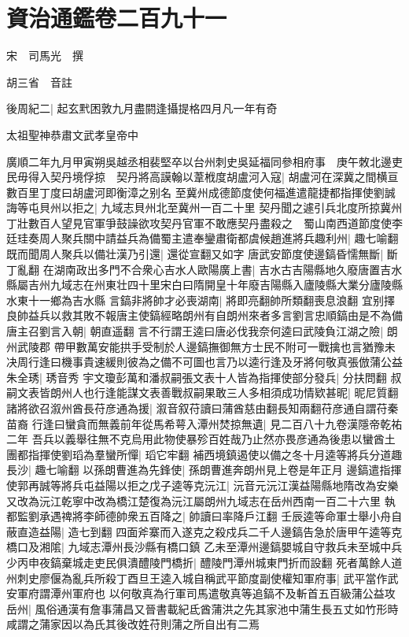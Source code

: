 \chapter{資治通鑑卷二百九十一}
宋　司馬光　撰

胡三省　音註

後周紀二|{
	起玄黓困敦九月盡閼逢攝提格四月凡一年有奇}


太祖聖神恭肅文武孝皇帝中

廣順二年九月甲寅朔吳越丞相裴堅卒以台州刺史吳延福同參相府事　庚午敇北邊吏民毋得入契丹境俘掠　契丹將高謨翰以葦栰度胡盧河入寇|{
	胡盧河在深冀之間横亘數百里丁度曰胡盧河即衡漳之别名}
至冀州成德節度使何福進遣龍捷都指揮使劉誠誨等屯貝州以拒之|{
	九域志貝州北至冀州一百二十里}
契丹聞之遽引兵北度所掠冀州丁壯數百人望見官軍爭鼓譟欲攻契丹官軍不敢應契丹盡殺之　蜀山南西道節度使李廷珪奏周人聚兵關中請益兵為備蜀主遣奉鑾肅衛都虞候趙進將兵趣利州|{
	趣七喻翻}
既而聞周人聚兵以備壮漢乃引還|{
	還從宣翻又如字}
唐武安節度使邊鎬昏懦無斷|{
	斷丁亂翻}
在湖南政出多門不合衆心吉水人歐陽廣上書|{
	吉水古吉陽縣地久廢唐置吉水縣屬吉州九域志在州東壮四十里宋白曰隋開皇十年廢吉陽縣入廬陵縣大業分廬陵縣水東十一鄉為吉水縣}
言鎬非將帥才必喪湖南|{
	將即亮翻帥所類翻喪息浪翻}
宜别擇良帥益兵以救其敗不報唐主使鎬經略朗州有自朗州來者多言劉言忠順鎬由是不為備唐主召劉言入朝|{
	朝直遥翻}
言不行謂王逵曰唐必伐我奈何逵曰武陵負江湖之險|{
	朗州武陵郡}
帶甲數萬安能拱手受制於人邊鎬撫御無方士民不附可一戰擒也言猶豫未决周行逢曰機事貴速緩則彼為之備不可圖也言乃以逵行逢及牙將何敬真張倣蒲公益朱全琇|{
	琇音秀}
宇文瓊彭萬和潘叔嗣張文表十人皆為指揮使部分發兵|{
	分扶問翻}
叔嗣文表皆朗州人也行逢能謀文表善戰叔嗣果敢三人多相須成功情欵甚昵|{
	昵尼質翻}
諸將欲召溆州酋長苻彦通為援|{
	溆音叙苻讀曰蒲酋慈由翻長知兩翻苻彦通自謂苻秦苗裔}
行逢曰蠻貪而無義前年從馬希萼入潭州焚掠無遺|{
	見二百八十九卷漢隱帝乾祐二年}
吾兵以義舉往無不克烏用此物使暴殄百姓哉乃止然亦畏彦通為後患以蠻酋土團都指揮使劉瑫為羣蠻所憚|{
	瑫它牢翻}
補西境鎮遏使以備之冬十月逵等將兵分道趣長沙|{
	趣七喻翻}
以孫朗曹進為先鋒使|{
	孫朗曹進奔朗州見上卷是年正月}
邊鎬遣指揮使郭再誠等將兵屯益陽以拒之戊子逵等克沅江|{
	沅音元沅江漢益陽縣地隋改為安樂又改為沅江乾寧中改為橋江楚復為沅江屬朗州九域志在岳州西南一百二十六里}
執都監劉承遇禆將李師德帥衆五百降之|{
	帥讀曰率降戶江翻}
壬辰逵等命軍士舉小舟自蔽直造益陽|{
	造七到翻}
四面斧寨而入遂克之殺戍兵二千人邊鎬告急於唐甲午逵等克橋口及湘隂|{
	九域志潭州長沙縣有橋口鎮}
乙未至潭州邊鎬嬰城自守救兵未至城中兵少丙申夜鎬棄城走吏民俱潰醴陵門橋折|{
	醴陵門潭州城東門折而設翻}
死者萬餘人道州刺史廖偃為亂兵所殺丁酉旦王逵入城自稱武平節度副使權知軍府事|{
	武平當作武安軍府謂潭州軍府也}
以何敬真為行軍司馬遣敬真等追鎬不及斬首五百級蒲公益攻岳州|{
	風俗通漢有詹事蒲昌又晉書載紀氐酋蒲洪之先其家池中蒲生長五丈如竹形時咸謂之蒲家因以為氏其後改姓苻則蒲之所自出有二焉}
